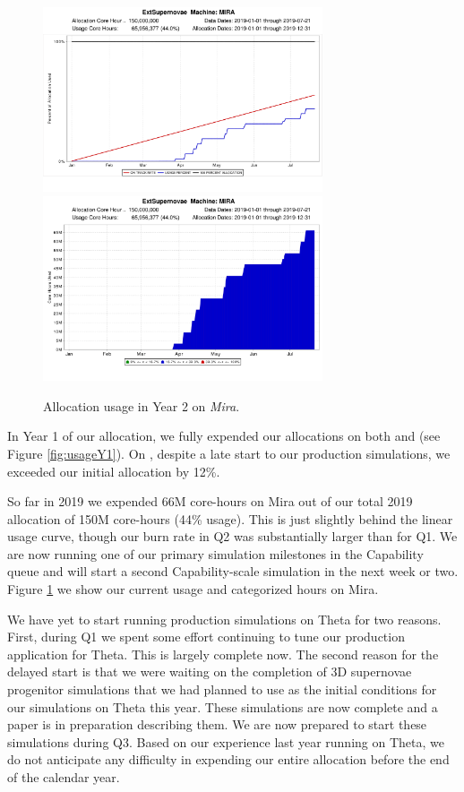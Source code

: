 \documentclass[12pt]{article}
\begin{document}
\begin{figure}
    \includegraphics[width=3.25in]{on_track_graph_mira.png}
    \includegraphics[width=3.25in]{categorized_hours_graph_mira.png} \\
    \caption{Allocation usage in Year 2 on {\it Mira}.}
    \label{fig:usage}
\end{figure}
    
In Year 1 of our allocation, we fully expended our allocations on both \mira and \thet (see Figure \ref{fig:usageY1}). 
On \thet, despite a late start to our production simulations, we exceeded our initial allocation by 12\%. 

So far in 2019 we expended 66M core-hours on Mira out of our total 2019 allocation of 150M core-hours (44\% usage). 
This is just slightly behind the linear usage curve, though our burn rate in Q2 was substantially larger than for Q1.
We are now running one of our primary simulation milestones in the Capability queue and will start a second Capability-scale simulation in the next week or two. 
Figure \ref{fig:usage} we show our current usage and categorized hours on Mira.

We have yet to start running production simulations on Theta for two reasons. 
First, during Q1 we spent some effort continuing to tune our production application for Theta. 
This is largely complete now.
The second reason for the delayed start is that we were waiting on the completion of 3D supernovae progenitor simulations that we had planned to use as the initial conditions for our simulations on Theta this year.
These simulations are now complete and a paper is in preparation describing them. 
We are now prepared to start these simulations during Q3. 
Based on our experience last year running on Theta, we do not anticipate any difficulty in expending our entire allocation before the end of the calendar year.
       
\end{document}
